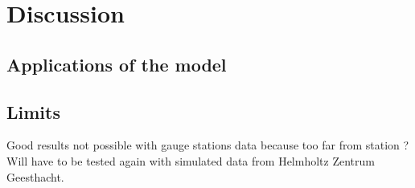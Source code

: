 \chapter{Discussion}
\label{chap:discussion}

\section{Applications of the model}
\section{Limits}
Good results not possible with gauge stations data because too far from station ? \newline
Will have to be tested again with simulated data from Helmholtz Zentrum Geesthacht.
